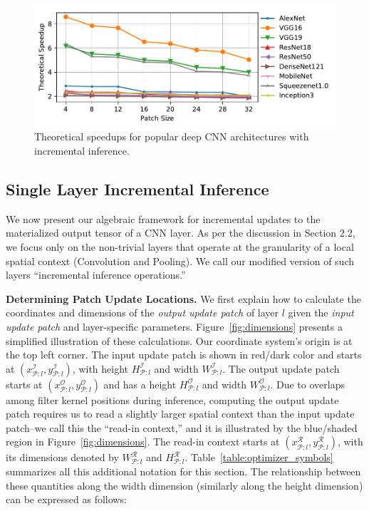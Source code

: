 \begin{figure}[t]
\includegraphics[width=\columnwidth]{images/redundancy_ratio}
\vspace{-8mm}
\caption{Theoretical speedups for popular deep CNN architectures with incremental inference.}
\label{fig:redundancy_ratio}
\end{figure}


\subsection{Single Layer Incremental Inference}\label{sec:inc_computation}
We now present our algebraic framework for incremental updates to the materialized output tensor of a CNN layer. As per the discussion in Section 2.2, we focus only on the non-trivial layers that operate at the granularity of a local spatial context (Convolution and Pooling). We call our modified version of such layers ``incremental inference operations.''

\vspace{2mm}
\noindent \textbf{Determining Patch Update Locations.} We first explain how to calculate the coordinates and dimensions of the \textit{output update patch} of layer $l$ given the \textit{input update patch} and layer-specific parameters. Figure~\ref{fig:dimensions} presents a simplified illustration of these calculations. Our coordinate system's origin is at the top left corner. The input update patch is shown in red/dark color and starts at $(x^\mathcal{I}_{\mathcal{P}:l}, y^\mathcal{I}_{\mathcal{P}:l})$, with height $H^\mathcal{I}_{\mathcal{P}:l}$ and width $W^\mathcal{I}_{\mathcal{P}:l}$. The output update patch starts at $(x^\mathcal{O}_{\mathcal{P}:l}, y^\mathcal{O}_{\mathcal{P}:l})$ and has a height $H^\mathcal{O}_{\mathcal{P}:l}$ and width $W^\mathcal{O}_{\mathcal{P}:l}$. Due to overlaps among filter kernel positions during inference, computing the output update patch requires us to read a slightly larger spatial context than the input update patch--we call this the ``read-in context,'' and it is illustrated by the blue/shaded region in Figure~\ref{fig:dimensions}. The read-in context starts at $(x^\mathcal{R}_{\mathcal{P}:l}, y^\mathcal{R}_{\mathcal{P}:l})$, with its dimensions denoted by $W^\mathcal{R}_{\mathcal{P}:l}$ and $H^\mathcal{R}_{\mathcal{P}:l}$. Table~\ref{table:optimizer_symbols} summarizes all this additional notation for this section. The relationship between these quantities along the width dimension (similarly along the height dimension) can be expressed as follows:



